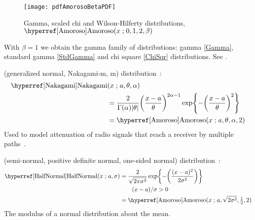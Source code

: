 
\begin{figure}[t]
\begin{center}
\texttt{[image: pdfAmorosoBetaPDF]}
\end{center}
\caption[Gamma, scaled chi and Wilson-Hilferty distributions]{Gamma, scaled chi and Wilson-Hilferty distributions, $\opr{Amoroso}(x\given 0,1,2,\beta)$}
\end{figure}

With $\beta=1$ we obtain the gamma family of distributions: gamma \eqref{Gamma}, standard gamma \eqref{StdGamma} and chi square \eqref{ChiSqr} distributions. See .



 (generalized normal, Nakagami-m, m) distribution~\cite{Nakagami1960}:
\begin{align}
\label{Nakagami}
 \opr{Nakagami}&(x \given a , \theta, \alpha) 
\\ \notag 
& =
 \frac{2}{\Gamma(\alpha) |\theta| }
\Left(\frac{x-a }{\theta}\Right)^{2\alpha -1}
\exp \Left\{
-  \Left(\frac{x-a }{\theta}\Right)^{2}
\Right\}
\checked
\\ \notag
& = \opr{Amoroso}(x\given a,\theta, \alpha ,2) \checked
\notag
\end{align}
Used to model attenuation of radio signals that reach a receiver by multiple paths~\cite{Nakagami1960}.




 (semi-normal, positive definite normal, one-sided normal) distribution~\cite{Johnson1994}:
%
\begin{align}
\label{HalfNormal}
\opr{HalfNormal}(x \given a, \sigma ) 
&= \frac{2}{\sqrt{2\pi \sigma^2}} 
\exp\Left\{-\Left( \frac{(x-a)^2}{2\sigma^2}\Right) \Right\}  
\checked
\\
& \qquad (x-a)/\sigma>0 \notag \\
&=  \opr{Amoroso}(x\given  a, \sqrt{2\sigma^2} , \tfrac{1}{2}, 2) \notag  \checked
\end{align}
The modulus of a normal distribution about the mean.

